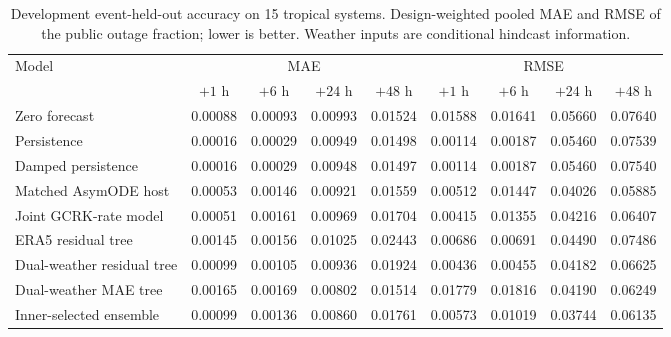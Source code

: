 \begin{table}[!ht]
\centering\small
\caption{Development event-held-out accuracy on 15 tropical systems. Design-weighted pooled MAE and RMSE of the public outage fraction; lower is better. Weather inputs are conditional hindcast information.}
\label{tab:tropical_forecasts}
\begin{tabular}{lcccccccc}
\toprule
\multirow{2}{*}{Model} & \multicolumn{4}{c}{MAE} & \multicolumn{4}{c}{RMSE} \\
\cmidrule(lr){2-5}\cmidrule(lr){6-9}
& $+1$ h & $+6$ h & $+24$ h & $+48$ h & $+1$ h & $+6$ h & $+24$ h & $+48$ h \\
\midrule
Zero forecast & 0.00088 & 0.00093 & 0.00993 & 0.01524 & 0.01588 & 0.01641 & 0.05660 & 0.07640 \\
Persistence & 0.00016 & 0.00029 & 0.00949 & 0.01498 & 0.00114 & 0.00187 & 0.05460 & 0.07539 \\
Damped persistence & 0.00016 & 0.00029 & 0.00948 & 0.01497 & 0.00114 & 0.00187 & 0.05460 & 0.07540 \\
Matched AsymODE host & 0.00053 & 0.00146 & 0.00921 & 0.01559 & 0.00512 & 0.01447 & 0.04026 & 0.05885 \\
Joint GCRK-rate model & 0.00051 & 0.00161 & 0.00969 & 0.01704 & 0.00415 & 0.01355 & 0.04216 & 0.06407 \\
ERA5 residual tree & 0.00145 & 0.00156 & 0.01025 & 0.02443 & 0.00686 & 0.00691 & 0.04490 & 0.07486 \\
Dual-weather residual tree & 0.00099 & 0.00105 & 0.00936 & 0.01924 & 0.00436 & 0.00455 & 0.04182 & 0.06625 \\
Dual-weather MAE tree & 0.00165 & 0.00169 & 0.00802 & 0.01514 & 0.01779 & 0.01816 & 0.04190 & 0.06249 \\
Inner-selected ensemble & 0.00099 & 0.00136 & 0.00860 & 0.01761 & 0.00573 & 0.01019 & 0.03744 & 0.06135 \\
\bottomrule
\end{tabular}
\end{table}
